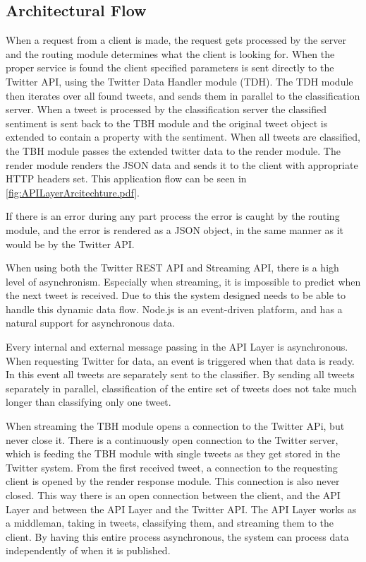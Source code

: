 \subsection{Architectural Flow}
When a request from a client is made, the request gets processed by the server and the routing module determines what the client is looking for. When the proper service is found the client specified parameters is sent directly to the Twitter API, using the Twitter Data Handler module (TDH). The TDH module then iterates over all found tweets, and sends them in parallel to the classification server. When a tweet is processed by the classification server the classified sentiment is sent back to the TBH module and the original tweet object is extended to contain a property with the sentiment. When all tweets are classified, the TBH module passes the extended twitter data to the render module. The render module renders the JSON data and sends it to the client with appropriate HTTP headers set. This application flow can be seen in \autoref{fig:APILayerArcitechture.pdf}.

If there is an error during any part process the error is caught by the routing module, and the error is rendered as a JSON object, in the same manner as it would be by the Twitter API. 

When using both the Twitter REST API and Streaming API, there is a high level of asynchronism. Especially when streaming, it is impossible to predict when the next tweet is received. Due to this the system designed needs to be able to handle this dynamic data flow. Node.js is an event-driven platform, and has a natural support for asynchronous data. 

Every internal and external message passing in the API Layer is asynchronous. When requesting Twitter for data, an event is triggered when that data is ready. In this event all tweets are separately sent to the classifier. By sending all tweets separately in parallel, classification of the entire set of tweets does not take much longer than classifying only one tweet. 

When streaming the TBH module opens a connection to the Twitter APi, but never close it. There is a continuously open connection to the Twitter server, which is feeding the TBH module with single tweets as they get stored in the Twitter system. From the first received tweet, a connection to the requesting client is opened by the render response module. This connection is also never closed. This way there is an open connection between the client, and the API Layer and between the API Layer and the Twitter API. The API Layer works as a middleman, taking in tweets, classifying them, and streaming them to the client. By having this entire process asynchronous, the system can process data independently of when it is published.


